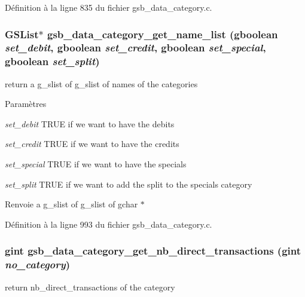 Définition à la ligne 835 du fichier gsb\_\-data\_\-category.c.

\subsubsection[{gsb\_\-data\_\-category\_\-get\_\-name\_\-list}]{\setlength{\rightskip}{0pt plus 5cm}GSList$\ast$ gsb\_\-data\_\-category\_\-get\_\-name\_\-list (gboolean {\em set\_\-debit}, \/  gboolean {\em set\_\-credit}, \/  gboolean {\em set\_\-special}, \/  gboolean {\em set\_\-split})}\label{gsb__data__category_8c_ac9e9466a500b7589b2b38af6ffdc9a27}
return a g\_\-slist of g\_\-slist of names of the categories


\begin{DoxyParams}{Paramètres}
\item[{\em set\_\-debit}]TRUE if we want to have the debits \item[{\em set\_\-credit}]TRUE if we want to have the credits \item[{\em set\_\-special}]TRUE if we want to have the specials \item[{\em set\_\-split}]TRUE if we want to add the split to the specials category\end{DoxyParams}
\begin{DoxyReturn}{Renvoie}
a g\_\-slist of g\_\-slist of gchar $\ast$ 
\end{DoxyReturn}


Définition à la ligne 993 du fichier gsb\_\-data\_\-category.c.

\subsubsection[{gsb\_\-data\_\-category\_\-get\_\-nb\_\-direct\_\-transactions}]{\setlength{\rightskip}{0pt plus 5cm}gint gsb\_\-data\_\-category\_\-get\_\-nb\_\-direct\_\-transactions (gint {\em no\_\-category})}\label{gsb__data__category_8c_af73e48e7177061fe93a61a3d2ea8f34c}
return nb\_\-direct\_\-transactions of the category


